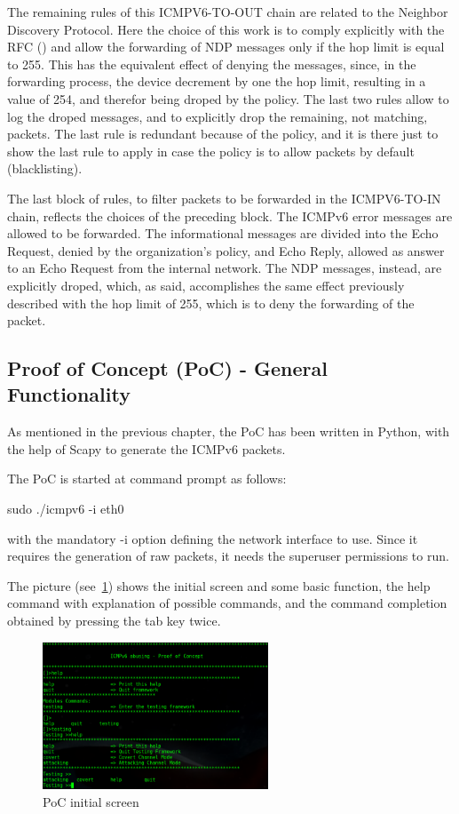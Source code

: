 \documentclass[12pt]{article}
\begin{document}
The remaining rules of this ICMPV6-TO-OUT chain are related to the Neighbor Discovery Protocol. Here the choice of this work is to comply explicitly with the RFC (\cite{rfc4861}) and allow the forwarding of NDP messages only if the hop limit is equal to 255. This has the equivalent effect of denying the messages, since, in the forwarding process, the device decrement by one the hop limit, resulting in a value of 254, and therefor being droped by the policy. The last two rules allow to log the droped messages, and to explicitly drop the remaining, not matching, packets. The last rule is redundant because of the policy, and it is there just to show the last rule to apply in case the policy is to allow packets by default (blacklisting).

The last block of rules, to filter packets to be forwarded in the ICMPV6-TO-IN chain, reflects the choices of the preceding block. The ICMPv6 error messages are allowed to be forwarded. The informational messages are divided into the Echo Request, denied by the organization's policy, and Echo Reply, allowed as answer to an Echo Request from the internal network. The NDP messages, instead, are explicitly droped, which, as said, accomplishes the same effect previously described with the hop limit of 255, which is to deny the forwarding of the packet.


\subsection{Proof of Concept (PoC) - General Functionality}
\label{PoC-general}

As mentioned in the previous chapter, the PoC has been written in Python, with the help of Scapy to generate the ICMPv6 packets.

The PoC is started at command prompt as follows:

sudo ./icmpv6 -i eth0

with the mandatory -i option defining the network interface to use. Since it requires the generation of raw packets, it needs the superuser permissions to run.

The picture (see~\ref{fig:pocMain}) shows the initial screen and some basic function, the help command with explanation of possible commands, and the command completion obtained by pressing the tab key twice.

\begin{figure}[ht] 
\begin{center}
\includegraphics[width=0.6\textwidth]{pocMain}
\caption{PoC initial screen}
\label{fig:pocMain}
\end{center}
\end{figure}
\end{document}
